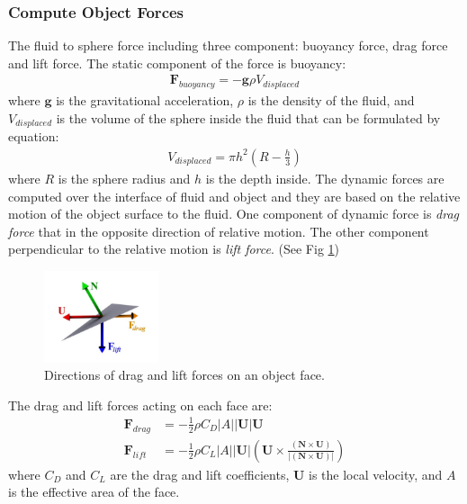 \documentclass[acmtog]{acmart}
\begin{document}
\subsubsection{Compute Object Forces}
 The fluid to sphere force including three component: buoyancy force, drag force and lift force.
 The static component of the force is buoyancy:
 \begin{equation*}
   \begin{aligned}
        \mathbf{F}_{buoyancy} = -\mathbf{g}\rho V_{displaced}
    \end{aligned}
\end{equation*}
where $\mathbf{g}$ is the gravitational acceleration, $\rho$ is the density of the fluid, and $V_{displaced}$ is the volume of the sphere inside the fluid that can be formulated by equation:
 \begin{equation*}
   \begin{aligned}
        V_{displaced} = \pi h^2\left(R-\frac{h}{3}\right)
    \end{aligned}
\end{equation*}
where $R$ is the sphere radius and $h$ is the depth inside.
The dynamic forces are computed over the interface of fluid and object and they are based on the relative motion of the object surface to the fluid. One component of dynamic force is \textit{drag force} that in the opposite direction of relative motion. The other component perpendicular to the relative motion is \textit{lift force}. (See Fig \ref{fig:2})
\begin{figure}[!htb]
  \centering
  \includegraphics[width=0.3\textwidth]{image/force.png}
  \caption{Directions of drag and lift forces on an object face.} 
\label{fig:2}
\end{figure}
The drag and lift forces acting on each face are:
 \begin{equation*}
   \begin{aligned}
        \mathbf{F}_{drag} &= -\frac{1}{2}\rho C_{D}|A||\mathbf{U}|\mathbf{U} \\
        \mathbf{F}_{lift} &= -\frac{1}{2}\rho C_{L}|A||\mathbf{U}|\left(\mathbf{U} \times \frac{(\mathbf{N} \times \mathbf{U})}{|(\mathbf{N} \times \mathbf{U})|}\right)
    \end{aligned}
\end{equation*}
where $C_D$ and $C_L$ are the drag and lift coefficients, $\mathbf{U}$ is the local velocity, and $A$ is the effective area of the face. 
\end{document}
